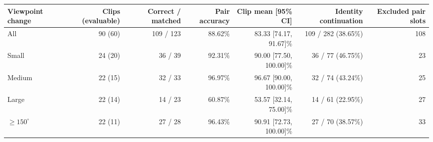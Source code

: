 \begin{tabular}{lrrrrrr}
\toprule
Viewpoint change & Clips (evaluable) & Correct / matched & Pair accuracy & Clip mean [95\% CI] & Identity continuation & Excluded pair slots \\
\midrule
All & 90 (60) & 109 / 123 & 88.62\% & 83.33 [74.17, 91.67]\% & 109 / 282 (38.65\%) & 108 \\
Small & 24 (20) & 36 / 39 & 92.31\% & 90.00 [77.50, 100.00]\% & 36 / 77 (46.75\%) & 23 \\
Medium & 22 (15) & 32 / 33 & 96.97\% & 96.67 [90.00, 100.00]\% & 32 / 74 (43.24\%) & 25 \\
Large & 22 (14) & 14 / 23 & 60.87\% & 53.57 [32.14, 75.00]\% & 14 / 61 (22.95\%) & 27 \\
$\geq150^\circ$ & 22 (11) & 27 / 28 & 96.43\% & 90.91 [72.73, 100.00]\% & 27 / 70 (38.57\%) & 33 \\
\bottomrule
\end{tabular}
